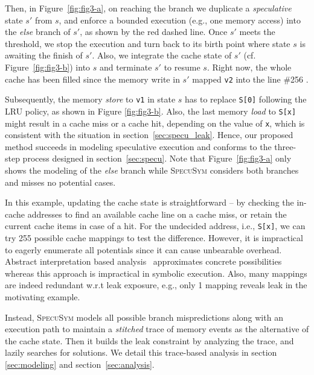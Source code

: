 \documentclass[sigconf]{acmart}
\newcommand\ignore[1]{}
\newcommand{\SpecuSym}{\textsc{SpecuSym} }
\begin{document}
Then, in Figure~\ref{fig:fig3-a}, on reaching the branch we duplicate a 
\textit{speculative} state $s'$ from $s$, and enforce a bounded execution
(e.g., one memory access) into the \textit{else} branch of $s'$, as shown 
by the red dashed line. Once $s'$ meets the threshold, we stop the 
execution and turn back to its birth point where state $s$ is awaiting 
the finish of $s'$. Also, we integrate the cache state of $s'$ (cf. 
Figure~\ref{fig:fig3-b}) into $s$ and terminate $s'$ to resume $s$. Right 
now, the whole cache has been filled since the memory write in $s'$ mapped 
\texttt{v2} into the line \#256 . 


Subsequently, the memory \emph{store} to \texttt{v1} in state $s$ has to 
replace \texttt{S[0]} following the LRU policy, as shown in Figure
\ref{fig:fig3-b}. Also, the last memory \emph{load} to \texttt{S[x]} might 
result in a cache miss or a cache hit, depending on the value of \texttt{x}, 
which is consistent with the situation in section~\ref{sec:specu_leak}. 
Hence, our proposed method succeeds in modeling speculative execution 
and conforms to the three-step process designed in section~\ref{sec:specu}. 
Note that Figure~\ref{fig:fig3-a} only shows the modeling of the \emph{else} 
branch while \SpecuSym considers both branches and misses no potential cases. 



\ignore{
In Figure~\ref{fig:fig3-a}, the speculative state $s'$ inherits the cache 
state from $s$, maps \texttt{v2} into a cache line, and merges back the updated 
cache state to state $s$ before its termination, as formally stated in Algorithm
\ref{alg:specusym} (lines 24-26). 
}


In this example, updating the cache state is straightforward -- by checking 
the in-cache addresses to find an available cache line on a cache miss, or 
retain the current cache items in case of a hit. For the undecided address, 
i.e., \texttt{S[x]}, we can try 255 possible cache mappings to test the 
difference. However, it is impractical to eagerly enumerate all potentials since it can 
cause unbearable overhead. Abstract interpretation based analysis~\cite{WuW19} 
approximates concrete possibilities whereas this approach is impractical in 
symbolic execution. Also, many mappings are indeed redundant w.r.t leak 
exposure, e.g., only 1 mapping reveals leak in the motivating example. 


Instead, \SpecuSym models all possible branch mispredictions along with  an execution 
path to maintain a \textit{stitched} trace of memory events as the alternative 
of the cache state. Then it builds the leak constraint by analyzing the trace, 
and lazily searches for solutions. We detail this trace-based analysis in section
\ref{sec:modeling} and section~\ref{sec:analysis}. 
\end{document}
